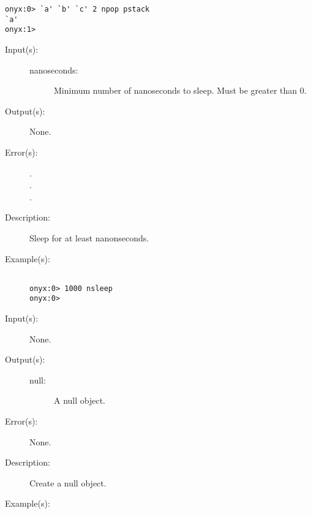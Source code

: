 \begin{description}
\begin{description}
\begin{verbatim}
onyx:0> `a' `b' `c' 2 npop pstack
`a'
onyx:1>
		\end{verbatim}
	\end{description}
\label{systemdict:nsleep}
\item[{\onyxop{nanoseconds}{nsleep}{--}}: ]
	\begin{description}\item[]
	\item[Input(s): ]
		\begin{description}\item[]
		\item[nanoseconds: ]
			Minimum number of nanoseconds to sleep.  Must be greater
			than 0.
		\end{description}
	\item[Output(s): ] None.
	\item[Error(s): ]
		\begin{description}\item[]
		\item[.]
		\item[.]
		\item[.]
		\end{description}
	\item[Description: ]
		Sleep for at least  nanonseconds.
	\item[Example(s): ]\begin{verbatim}

onyx:0> 1000 nsleep
onyx:0>
		\end{verbatim}
	\end{description}
\label{systemdict:null}
\item[{\onyxop{--}{null}{null}}: ]
	\begin{description}\item[]
	\item[Input(s): ] None.
	\item[Output(s): ]
		\begin{description}\item[]
		\item[null: ]
			A null object.
		\end{description}
	\item[Error(s): ] None.
	\item[Description: ]
		Create a null object.
	\item[Example(s): ]\begin{verbatim}


\end{verbatim}
\end{description}
\end{description}
